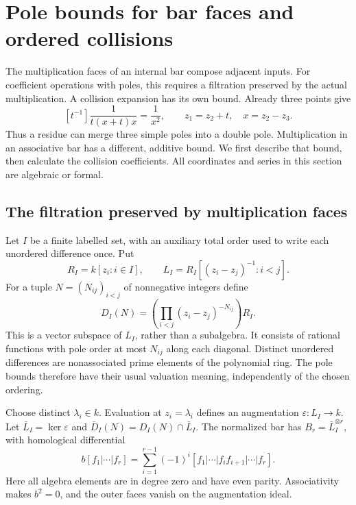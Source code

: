 \section{Pole bounds for bar faces and ordered collisions}
\label{op:sec:ordered-poles}

The multiplication faces of an internal bar compose adjacent inputs.
For coefficient operations with poles, this requires a filtration
preserved by the actual multiplication.  A collision expansion has its
own bound.  Already three
points give
\begin{equation}\label{op:eq:three-simple-poles}
 [t^{-1}]\frac{1}{t(x+t)x}=\frac{1}{x^2},
 \qquad z_1=z_2+t,\quad x=z_2-z_3.
\end{equation}
Thus a residue can merge three simple poles into a double pole.
Multiplication in an associative bar has a different, additive bound.
We first describe that bound, then calculate the collision coefficients.
All coordinates and series in this section are algebraic or formal.

\subsection{The filtration preserved by multiplication faces}

Let \(I\) be a finite labelled set, with an auxiliary total order used
to write each unordered difference once.  Put
\[
 R_I=k[z_i:i\in I],\qquad
 L_I=R_I[(z_i-z_j)^{-1}:i<j].
\]
For a tuple \(N=(N_{ij})_{i<j}\) of nonnegative integers define
\[
 D_I(N)=\left(\prod_{i<j}(z_i-z_j)^{-N_{ij}}\right)R_I.
\]
This is a vector subspace of \(L_I\), rather than a subalgebra.
It consists of rational functions with pole order at most \(N_{ij}\)
along each diagonal.  Distinct unordered differences are nonassociated
prime elements of the polynomial ring.  The pole bounds therefore have
their usual valuation meaning, independently of the chosen ordering.

Choose distinct \(\lambda_i\in k\).  Evaluation at \(z_i=\lambda_i\)
defines an augmentation \(\varepsilon:L_I\to k\).  Let
\(\bar L_I=\ker\varepsilon\) and
\(\bar D_I(N)=D_I(N)\cap\bar L_I\).  The normalized bar has
\(B_r=\bar L_I^{\otimes r}\), with homological differential
\begin{equation}\label{op:eq:pole-bar-differential}
 b[f_1|\cdots|f_r]
 =\sum_{i=1}^{r-1}(-1)^i
 [f_1|\cdots|f_if_{i+1}|\cdots|f_r].
\end{equation}
Here all algebra elements are in degree zero and have even parity.
Associativity makes \(b^2=0\), and the outer faces vanish on the
augmentation ideal.

